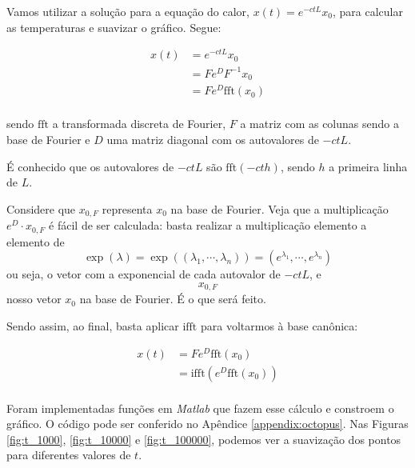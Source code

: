 \documentclass{article}
\begin{document}
\begin{enumerate}
\begin{enumerate}
                        Vamos utilizar a solução para a equação do calor,
                        $x(t) = e^{-c t L} x_0$, para calcular as temperaturas
                        e suavizar o gráfico. Segue:

                        \begin{align*}
                            x(t) &= e^{-c t L} x_0 \\
                            &= F e^{D} F^{-1} x_0 \\
                            &= F e^{D} \textrm{fft}(x_0) \\
                        \end{align*}

                        sendo $\textrm{fft}$ a transformada discreta de Fourier,
                        $F$ a matriz com as colunas sendo a base de Fourier e
                        $D$ uma matriz diagonal com os autovalores de
                        $-ctL$.

                        É conhecido que os autovalores de $-ctL$ são $\textrm{fft}(-cth)$,
                        sendo $h$ a primeira linha de $L$.

                        Considere que $x_{0,F}$ representa $x_0$ na base de Fourier.
                        Veja que a multiplicação $e^D \cdot x_{0, F}$ é fácil de ser calculada:
                        basta realizar a multiplicação elemento a elemento de
                        $$\exp(\lambda) = \exp((\lambda_1, \cdots, \lambda_n)) = \left(e^{\lambda_1}, \cdots, e^{\lambda_n}\right)$$
                        ou seja, o vetor com a exponencial de cada autovalor de $-ctL$, e
                        $$x_{0, F}$$
                        nosso vetor $x_0$ na base de Fourier. É o que será feito.

                        Sendo assim, ao final, basta aplicar $\textrm{ifft}$ para voltarmos
                        à base canônica:

                        \begin{align*}
                            x(t) &= F e^{D} \textrm{fft}(x_0) \\
                            &= \textrm{ifft}\left(e^{D} \textrm{fft}(x_0)\right) \\
                        \end{align*}

                        Foram implementadas funções em \textit{Matlab} que fazem esse cálculo e
                        constroem o gráfico. O código pode ser conferido no Apêndice \ref{appendix:octopus}.
                        Nas Figuras \ref{fig:t_1000}, \ref{fig:t_10000} e
                        \ref{fig:t_100000}, podemos ver a suavização dos pontos para diferentes valores de $t$.


\end{enumerate}
\end{enumerate}
\end{document}
